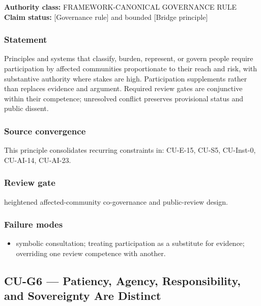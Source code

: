 \documentclass[
  11pt,
]{article}
\providecommand{\tightlist}{%
  \setlength{\itemsep}{0pt}\setlength{\parskip}{0pt}}
\begin{document}
\textbf{Authority class:} FRAMEWORK-CANONICAL GOVERNANCE RULE\\
\textbf{Claim status:} {[}Governance rule{]} and bounded {[}Bridge
principle{]}

\subsubsection{Statement}\label{statement-55}

Principles and systems that classify, burden, represent, or govern
people require participation by affected communities proportionate to
their reach and risk, with substantive authority where stakes are high.
Participation supplements rather than replaces evidence and argument.
Required review gates are conjunctive within their competence;
unresolved conflict preserves provisional status and public dissent.

\subsubsection{Source convergence}\label{source-convergence-4}

This principle consolidates recurring constraints in: CU-E-15, CU-S5,
CU-Inst-0, CU-AI-14, CU-AI-23.

\subsubsection{Review gate}\label{review-gate-11}

heightened affected-community co-governance and public-review design.

\subsubsection{Failure modes}\label{failure-modes-28}

\begin{itemize}
\tightlist
\item
  symbolic consultation; treating participation as a substitute for
  evidence; overriding one review competence with another.
\end{itemize}

\subsection{CU-G6 --- Patiency, Agency, Responsibility, and Sovereignty
Are
Distinct}\label{cu-g6-patiency-agency-responsibility-and-sovereignty-are-distinct}
\end{document}
